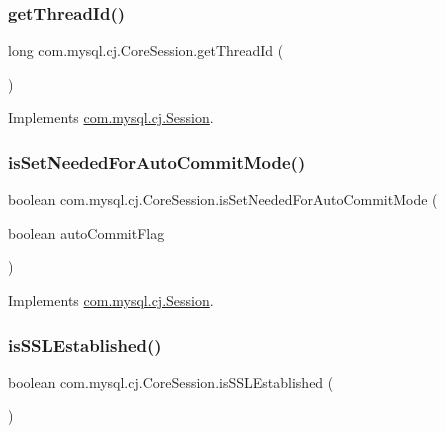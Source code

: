 \subsubsection{\texorpdfstring{get\+Thread\+Id()}{getThreadId()}}
{\footnotesize\ttfamily long com.\+mysql.\+cj.\+Core\+Session.\+get\+Thread\+Id (\begin{DoxyParamCaption}{ }\end{DoxyParamCaption})}



Implements \mbox{\hyperlink{interfacecom_1_1mysql_1_1cj_1_1_session_a01afd0778a66788ef0d93cb9c20baf5a}{com.\+mysql.\+cj.\+Session}}.

\mbox{\label{classcom_1_1mysql_1_1cj_1_1_core_session_a126e95932ffb8fdf73b7c4ae4d43972b}} 
\subsubsection{\texorpdfstring{is\+Set\+Needed\+For\+Auto\+Commit\+Mode()}{isSetNeededForAutoCommitMode()}}
{\footnotesize\ttfamily boolean com.\+mysql.\+cj.\+Core\+Session.\+is\+Set\+Needed\+For\+Auto\+Commit\+Mode (\begin{DoxyParamCaption}\item[{boolean}]{auto\+Commit\+Flag }\end{DoxyParamCaption})}



Implements \mbox{\hyperlink{interfacecom_1_1mysql_1_1cj_1_1_session_a3f747951ef258e5219237177aa3d4311}{com.\+mysql.\+cj.\+Session}}.

\mbox{\label{classcom_1_1mysql_1_1cj_1_1_core_session_ae1223b9bea2fae5aa55cc356aab2c079}} 
\subsubsection{\texorpdfstring{is\+S\+S\+L\+Established()}{isSSLEstablished()}}
{\footnotesize\ttfamily boolean com.\+mysql.\+cj.\+Core\+Session.\+is\+S\+S\+L\+Established (\begin{DoxyParamCaption}{ }\end{DoxyParamCaption})}



